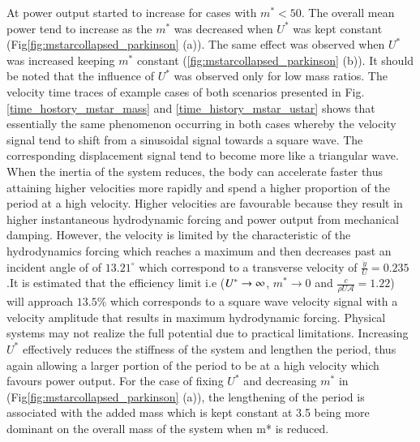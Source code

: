 At  power output started to increase for cases with $m^*<50$. The overall mean power tend to increase  as the $m^*$ was decreased when $U^*$ was kept constant (Fig\ref{fig:mstarcollapsed_parkinson} (a)). The same effect was observed when $U^*$ was increased keeping $m^*$ constant (\ref{fig:mstarcollapsed_parkinson} (b)). It should be noted that the influence of $U^*$ was observed only for low mass ratios.  The velocity time traces of example cases of both scenarios presented in Fig.\ref{time_hostory_mstar_mass} and \ref{time_history_mstar_ustar} shows that essentially the same phenomenon occurring in both cases whereby the velocity signal tend to shift from a sinusoidal signal towards a square wave. The corresponding displacement signal tend to become more like a triangular wave. When the inertia of the system reduces, the body can accelerate faster thus attaining higher velocities more rapidly and spend a higher proportion of the period at a high velocity. Higher velocities are favourable because they result in higher instantaneous hydrodynamic forcing and power output from mechanical damping. However, the velocity is limited by the characteristic of the hydrodynamics forcing which reaches a maximum and then decreases past an incident angle of of $13.21^{\circ}$ which correspond to a transverse velocity of $\frac{\dot{y}}{U}=0.235$.It is estimated that the efficiency limit i.e ($U^{*} \rightarrow \infty$, $m^* \rightarrow 0$ and $\frac{c}{\rho U \mathcal{A}}=1.22$) will approach $13.5\%$ which corresponds to a square wave velocity signal with a velocity amplitude that results in maximum  hydrodynamic forcing. Physical systems may not realize the full potential due to practical limitations. Increasing $U^*$ effectively reduces the stiffness of the system and lengthen the period, thus again allowing a larger portion of the period to be at a high velocity which favours power output. For the case of fixing $U^*$ and decreasing $m^*$ in (Fig\ref{fig:mstarcollapsed_parkinson} (a)), the lengthening of the period is associated with the added mass which is kept constant at 3.5 being more dominant on the overall mass of the system when m* is reduced. 


  












 

